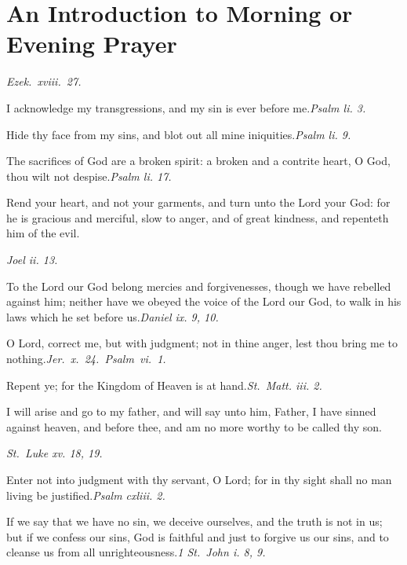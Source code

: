 \chapter[An Introduction]{An Introduction to Morning or Evening Prayer}


\hfill\emph{Ezek.~xviii.~27.}

I acknowledge my transgressions, and my sin is ever before me.\hfill\emph{Psalm li. 3.}

Hide thy face from my sins, and blot out all mine iniquities.\hfill\emph{Psalm li. 9.}

The sacrifices of God are a broken spirit: a broken and a contrite heart, O God, thou wilt not despise.\hfill\emph{Psalm li. 17.}

Rend your heart, and not your garments, and turn unto the Lord your God: for he is gracious and merciful, slow to anger, and of great kindness, and repenteth him of the evil.

\hfill\emph{Joel ii. 13.}

To the Lord our God belong mercies and forgivenesses, though we have rebelled against him; neither have we obeyed the voice of the Lord our God, to walk in his laws which he set before us.\hfill\emph{Daniel ix. 9, 10.}

O Lord, correct me, but with judgment; not in thine anger, lest thou bring me to nothing.\hfill\emph{Jer.~x.~24.~Psalm~vi.~1.}

Repent ye; for the Kingdom of Heaven is at hand.\hfill\emph{St.\ Matt. iii. 2.}

I will arise and go to my father, and will say unto him, Father, I have sinned against heaven, and before thee, and am no more worthy to be called thy son.

\hfill\emph{St.\ Luke xv. 18, 19.}

Enter not into judgment with thy servant, O Lord; for in thy sight shall no man living be justified.\hfill\emph{Psalm cxliii. 2.}

If we say that we have no sin, we deceive ourselves, and the truth is not in us; but if we confess our sins, God is faithful and just to forgive us our sins, and to cleanse us from all unrighteousness.\hfill\emph{1 St.\ John i. 8, 9.}

